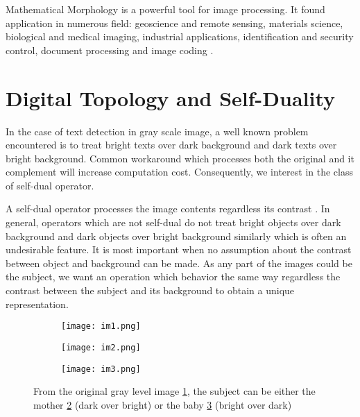 \par Mathematical Morphology is a powerful tool for image processing. It found application in numerous field: geoscience and remote sensing, materials science, biological and medical imaging, industrial applications, identification and security control, document processing and image coding \cite{Soille:2003:MIA:773286}. 


\section{Digital Topology and Self-Duality}
\par 
In the case of text detection in gray scale image, a well known problem encountered is to treat bright texts over dark background and dark texts over bright background. Common workaround which processes both the original and it complement will increase computation cost. Consequently, we interest in the class of self-dual operator.
\par
A self-dual operator processes the image contents regardless its contrast \cite{geraud.15.ismm}. In general, operators which are not self-dual do not treat bright objects over dark background and dark objects over bright background similarly which is often an undesirable feature. It is most important when no assumption about the contrast between object and background can be made. As any part of the images could be the subject, we want an operation which behavior the same way regardless the contrast between the subject and its background to obtain a unique representation.  
\begin{figure}

	\begin{subfigure}{0.3\textwidth}
	 	\texttt{[image: im1.png]} \caption{}\label{fig:gray} \end{subfigure}
	\begin{subfigure}{0.3\textwidth}
		\texttt{[image: im2.png]} \caption{}\label{fig:mother} \end{subfigure}
	\begin{subfigure}{0.3\textwidth}
		\texttt{[image: im3.png]} \caption{}\label{fig:baby} \end{subfigure}
	\centering
	\caption[Example of \textit{subjects}] {From the original gray level image \ref{fig:gray}, the subject can be either the mother \ref{fig:mother} (dark over bright) or the baby \ref{fig:baby} (bright over dark) }
	\label{fig:motheAndBaby}
\end{figure}

